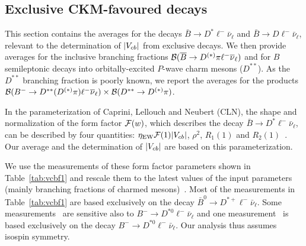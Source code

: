 \subsection{Exclusive CKM-favoured decays}
\label{slbdecays_b2cexcl}
This section contains the averages for the decays $\bar B\to
D^*\ell^-\bar\nu_\ell$ and $\bar B\to D\ell^-\bar\nu_\ell$, relevant
to the determination of $|V_{cb}|$ from exclusive decays. We then provide
averages for the inclusive branching fractions $\cbf(\bar B\to
D^{(*)}\pi \ell^-\bar\nu_\ell)$ and for $B$ semileptonic decays into
orbitally-excited $P$-wave charm mesons ($D^{**}$). As the $D^{**}$
branching fraction is poorly known, we report the averages for the products 
$\cbf(B^-\to D^{**}(D^{(*)}\pi)\ell^-\bar\nu_\ell)\times
\cbf(D^{**}\to D^{(*)}\pi)$.


\label{slbdecays_dstarlnu}

In the parameterization of Caprini, Lellouch and Neubert (CLN), the
shape and normalization of the form factor ${\cal F}(w)$, which
describes the decay $\bar B\to D^*\ell^-\bar\nu_\ell$, can be
described by four quantities: $\eta_\mathrm{EW}{\cal F}(1)|V_{cb}|$,
$\rho^2$, $R_1(1)$ and $R_2(1)$~\cite{CLN}. Our average and the
determination of $|V_{cb}|$ are based on this parameterization.

We use the measurements of these form factor parameters shown in
Table~\ref{tab:vcbf1} and rescale them to the latest values of the
input parameters (mainly branching fractions of charmed
mesons)~\cite{HFAG_sl:inputparams}. Most of the measurements in
Table~\ref{tab:vcbf1} are based exclusively on the decay $\bar B^0\to
D^{*+}\ell^-\bar\nu_\ell$. Some
measurements~\cite{Adam:2002uw,Aubert:2009_1} are sensitive also to
$B^-\to D^{*0}\ell^-\bar\nu_\ell$ and one
measurement~\cite{Aubert:2009_3} is based exclusively on the decay
$B^-\to D^{*0}\ell^-\bar\nu_\ell$. Our analysis thus assumes isospin
symmetry.


